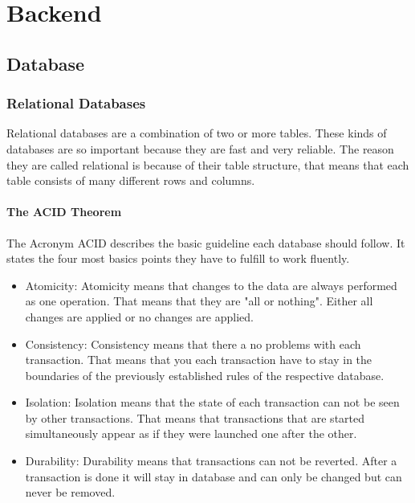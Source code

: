 \chapter{Backend}
\section{Database}
\subsection{Relational Databases}
    Relational databases are a combination of two or more tables.
    These kinds of databases are so important because they are fast and very reliable. 
    The reason they are called relational is because of their table structure, that means that each table consists of many different rows and columns.
\subsubsection{The ACID Theorem}
The Acronym ACID describes the basic guideline each database should follow. It states the four most basics points they have to fulfill to work fluently.
\begin{itemize}
    \item Atomicity: Atomicity means that changes to the data are always performed as one operation. That means that they are "all or nothing". Either all changes are applied or no changes are applied.
    \item Consistency: Consistency means that there a no problems with each transaction. That means that you each transaction have to stay in the boundaries of the previously established rules of the respective database.
    \item Isolation: Isolation means that the state of each transaction can not be seen by other transactions. That means that transactions that are started simultaneously appear as if they were launched one after the other.
    \item Durability: Durability means that transactions can not be reverted. After a transaction is done it will stay in database and can only be changed but can never be removed.
\end{itemize}
